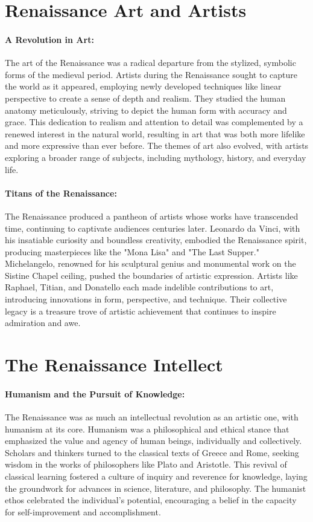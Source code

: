 \documentclass{book}
\begin{document}
\section*{Renaissance Art and Artists}

\paragraph{A Revolution in Art:}
The art of the Renaissance was a radical departure from the stylized, symbolic forms of the medieval period. Artists during the Renaissance sought to capture the world as it appeared, employing newly developed techniques like linear perspective to create a sense of depth and realism. They studied the human anatomy meticulously, striving to depict the human form with accuracy and grace. This dedication to realism and attention to detail was complemented by a renewed interest in the natural world, resulting in art that was both more lifelike and more expressive than ever before. The themes of art also evolved, with artists exploring a broader range of subjects, including mythology, history, and everyday life.

\paragraph{Titans of the Renaissance:}
The Renaissance produced a pantheon of artists whose works have transcended time, continuing to captivate audiences centuries later. Leonardo da Vinci, with his insatiable curiosity and boundless creativity, embodied the Renaissance spirit, producing masterpieces like the "Mona Lisa" and "The Last Supper." Michelangelo, renowned for his sculptural genius and monumental work on the Sistine Chapel ceiling, pushed the boundaries of artistic expression. Artists like Raphael, Titian, and Donatello each made indelible contributions to art, introducing innovations in form, perspective, and technique. Their collective legacy is a treasure trove of artistic achievement that continues to inspire admiration and awe.

\section*{The Renaissance Intellect}

\paragraph{Humanism and the Pursuit of Knowledge:}
The Renaissance was as much an intellectual revolution as an artistic one, with humanism at its core. Humanism was a philosophical and ethical stance that emphasized the value and agency of human beings, individually and collectively. Scholars and thinkers turned to the classical texts of Greece and Rome, seeking wisdom in the works of philosophers like Plato and Aristotle. This revival of classical learning fostered a culture of inquiry and reverence for knowledge, laying the groundwork for advances in science, literature, and philosophy. The humanist ethos celebrated the individual's potential, encouraging a belief in the capacity for self-improvement and accomplishment.
\end{document}
